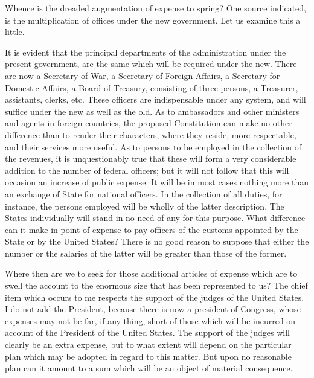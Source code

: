 Whence is the dreaded augmentation of expense to spring? One source indicated, is the multiplication of offices under the new government. Let us examine this a little.

It is evident that the principal departments of the administration under the present government, are the same which will be required under the new. There are now a Secretary of War, a Secretary of Foreign Affairs, a Secretary for Domestic Affairs, a Board of Treasury, consisting of three persons, a Treasurer, assistants, clerks, etc. These officers are indispensable under any system, and will suffice under the new as well as the old. As to ambassadors and other ministers and agents in foreign countries, the proposed Constitution can make no other difference than to render their characters, where they reside, more respectable, and their services more useful. As to persons to be employed in the collection of the revenues, it is unquestionably true that these will form a very considerable addition to the number of federal officers; but it will not follow that this will occasion an increase of public expense. It will be in most cases nothing more than an exchange of State for national officers. In the collection of all duties, for instance, the persons employed will be wholly of the latter description. The States individually will stand in no need of any for this purpose. What difference can it make in point of expense to pay officers of the customs appointed by the State or by the United States? There is no good reason to suppose that either the number or the salaries of the latter will be greater than those of the former.

Where then are we to seek for those additional articles of expense which are to swell the account to the enormous size that has been represented to us? The chief item which occurs to me respects the support of the judges of the United States. I do not add the President, because there is now a president of Congress, whose expenses may not be far, if any thing, short of those which will be incurred on account of the President of the United States. The support of the judges will clearly be an extra expense, but to what extent will depend on the particular plan which may be adopted in regard to this matter. But upon no reasonable plan can it amount to a sum which will be an object of material consequence.

